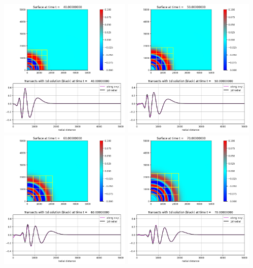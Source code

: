 \documentclass[11pt]{article}
\begin{document}
\vskip 10pt 
\includegraphics[width=0.475\textwidth]{frame0004fig20.png}
\vskip 10pt 
\includegraphics[width=0.475\textwidth]{frame0005fig20.png}
\vskip 10pt 
\includegraphics[width=0.475\textwidth]{frame0006fig20.png}
\vskip 10pt 
\includegraphics[width=0.475\textwidth]{frame0007fig20.png}
\end{document}
